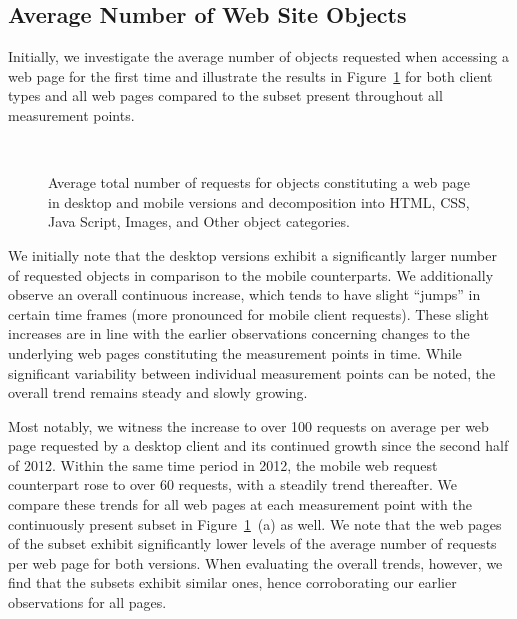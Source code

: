 \subsection*{Average Number of Web Site Objects}
\label{ss:objects}
Initially, we investigate the average number of objects requested when accessing a web page for the first time and illustrate the results in Figure~\ref{fig:requests} for both client types and all web pages compared to the subset present throughout all measurement points.
\begin{figure}
\centering
	\\ 
	\qquad
	\qquad
\caption{Average total number of requests for objects constituting a web page in desktop and mobile versions and decomposition into  HTML, CSS, Java Script, Images, and Other object categories.\label{fig:requests}}
\end{figure}
We initially note that the desktop versions exhibit a significantly larger number of requested objects in comparison to the mobile counterparts.
We additionally observe an overall continuous increase, which tends to have slight ``jumps'' in certain time frames (more pronounced for mobile client requests). 
These slight increases are in line with the earlier observations concerning changes to the underlying web pages constituting the measurement points in time. While significant variability between individual measurement points can be noted,  the overall trend remains steady and slowly growing.


Most notably, we witness the increase to over 100 requests on average per web page requested by a desktop client and its continued growth since the second half of 2012.
Within the same time period in 2012, the mobile web request counterpart rose to over 60 requests, with a steadily trend thereafter. 
We compare these trends for all web pages at each measurement point with the continuously present subset in Figure~\ref{fig:requests}~(a) as well.
We note that the web pages of the subset exhibit significantly lower levels of the average number of requests per web page for both versions. 
When evaluating the overall trends, however, we find that the subsets exhibit similar ones, hence corroborating our earlier observations for all pages.

